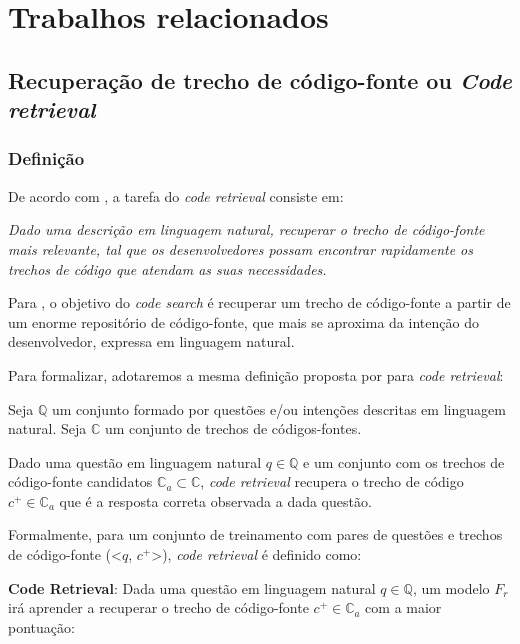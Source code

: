 \chapter{Trabalhos relacionados}
\label{cap:trabalhos-relacionados}



\section{Recuperação de trecho de código-fonte ou \textit{Code retrieval}}
\label{sec:code-retrieval}

\subsection{Definição}\label{sec:code-retrieval-definicao}
De acordo com \cite{Chen-bi-variational-autoencoder:2018}, a tarefa do \textit{code retrieval} consiste em:

\emph{Dado uma descrição em linguagem natural, recuperar o trecho de código-fonte mais relevante, tal que os desenvolvedores possam encontrar rapidamente os trechos de código que atendam as suas necessidades.}

Para \cite{cambronero-deep-learning-code-search:2019}, o objetivo do \textit{code search} é recuperar um trecho de código-fonte a partir de um enorme repositório de código-fonte, que mais se aproxima da intenção do desenvolvedor, expressa em linguagem natural. 

Para formalizar, adotaremos a mesma definição proposta por \cite{iyer-etal-2016-summarizing, Yao-coacor:2019} para \textit{code retrieval}:

Seja $\mathbb{Q}$ um conjunto formado por questões e/ou intenções descritas em linguagem natural. Seja $\mathbb{C}$ um conjunto de trechos de códigos-fontes.

Dado uma questão em linguagem natural $q \in \mathbb{Q}$ e um conjunto com os trechos de código-fonte candidatos $\mathbb{C}_{a} \subset \mathbb{C}$, \textit{code retrieval} recupera o trecho de código $c^{+} \in \mathbb{C}_{a}$ que é a resposta correta observada a dada questão.

Formalmente, para um conjunto de treinamento com pares de questões e trechos de código-fonte (<$q$, $c^{+}$>), \textit{code retrieval} é definido como:

\textbf{Code Retrieval}: Dada uma questão em linguagem natural $q \in \mathbb{Q}$, um modelo $F_{r}$ irá aprender a recuperar o trecho de código-fonte $c^{+} \in \mathbb{C}_{a}$ com a maior pontuação:

